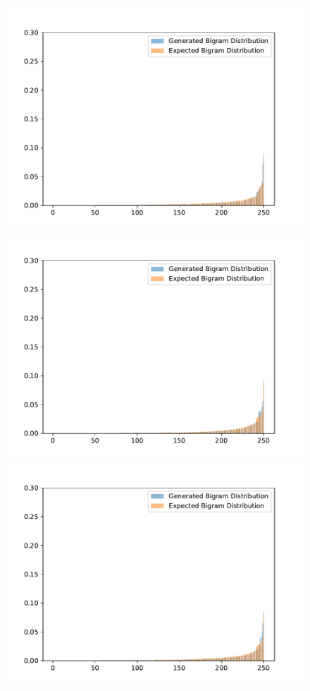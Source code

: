 \begin{figure}[H]
	\includegraphics[width=\linewidth]{img/plots/reddit/bigram_distribution_comparison_step_1500000.pdf}
	\centering
	\small
	\endminipage\hfill
	\includegraphics[width=\linewidth]{img/plots/reddit/bigram_distribution_comparison_step_2000000.pdf}
	\centering
	\small
	\endminipage\hfill
	\includegraphics[width=\linewidth]{img/plots/reddit/bigram_distribution_comparison_step_2500000.pdf}

\end{figure}
